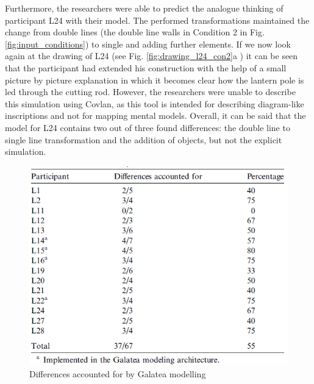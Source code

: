 \documentclass[12pt]{article}
\begin{document}
Furthermore, the researchers were able to predict the analogue thinking of participant L24 with their model. The performed transformations maintained the change from double lines (the double line walls in Condition 2 in Fig. \ref{fig:input_conditions}) to single and adding further elements.  If we now look again at the drawing of L24 (see Fig. \ref{fig:drawing_l24_con2}a ) it can be seen that the participant had extended his construction with the help of a small picture by picture explanation in which it becomes clear how the lantern pole is led through the cutting rod.  However, the researchers were unable to describe this simulation using Covlan, as this tool is intended for describing diagram-like inscriptions and not for mapping mental models. Overall, it can be said that the model for L24 contains two out of three found differences: the double line to single line transformation and the addition of objects, but not the explicit simulation.

\begin{figure}[H]
  \centering
  \includegraphics[width=0.7\linewidth]{images/differences_found.PNG}
  \caption{\label{fig:differences_found}Differences accounted for by Galatea modelling}
\end{figure}  

\end{document}
